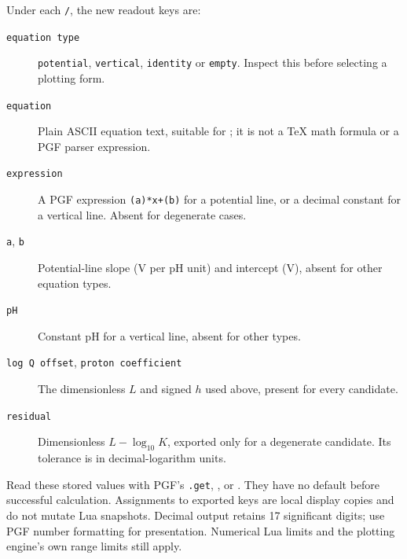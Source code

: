 \documentclass[a4paper,11pt]{ltxdoc}
\begin{document}
Under each \texttt{/}, the new readout keys are:
\begin{description}
\item[\texttt{equation type}] \texttt{potential}, \texttt{vertical},
  \texttt{identity} or \texttt{empty}. Inspect this before selecting a plotting form.
\item[\texttt{equation}] Plain ASCII equation text, suitable for ;
  it is not a TeX math formula or a PGF parser expression.
\item[\texttt{expression}] A PGF expression \texttt{(a)*x+(b)} for a potential
  line, or a decimal constant for a vertical line. Absent for degenerate cases.
\item[\texttt{a}, \texttt{b}] Potential-line slope (V per pH unit) and intercept
  (V), absent for other equation types.
\item[\texttt{pH}] Constant pH for a vertical line, absent for other types.
\item[\texttt{log Q offset}, \texttt{proton coefficient}] The dimensionless
  $L$ and signed $h$ used above, present for every candidate.
\item[\texttt{residual}] Dimensionless $L-\log_{10}K$, exported only for a
  degenerate candidate. Its tolerance is in decimal-logarithm units.
\end{description}
Read these stored values with PGF's \texttt{.get}, , or
. They have no default before successful calculation.
Assignments to exported keys are local display copies and do not mutate Lua
snapshots. Decimal output retains 17 significant digits; use PGF number
formatting for presentation. Numerical Lua limits and the plotting engine's
own range limits still apply.
\end{document}
